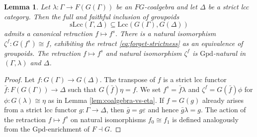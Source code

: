 \documentclass[a4paper]{article}
\newtheorem{lemma}[theorem]{Lemma}
\theoremstyle{remark}
\theoremstyle{definition}
\begin{document}
\begin{lemma}
  \label{lem:strictification}
  Let $\lambda : \Gamma \rightarrow F(G(\Gamma))$ be an $FG$-coalgebra and let $\Delta$ be a strict lcc category.
  Then the full and faithful inclusion of groupoids
  \begin{equation}
    \label{eq:forget-strictness}
    \mathrm{sLcc}(\Gamma, \Delta) \subseteq \mathrm{Lcc}(G(\Gamma), G(\Delta))
  \end{equation}
  admits a canonical retraction $f \mapsto f^s$.
  There is a natural isomorphism $\zeta^f : G(f^s) \cong f$, exhibiting the retract \eqref{eq:forget-strictness} as an equivalence of groupoids.
  The retraction $f \mapsto f^s$ and natural isomorphism $\zeta^f$ is $\mathrm{Gpd}$-natural in $(\Gamma, \lambda)$ and $\Delta$.
\end{lemma}
\begin{proof}
  Let $f : G(\Gamma) \rightarrow G(\Delta)$.
  The transpose of $f$ is a strict lcc functor $\bar f : F(G(\Gamma)) \rightarrow \Delta$ such that $G(\bar f) \eta = f$.
  We set $f^s = \bar f \lambda$ and $\zeta^f = G(\bar f) \phi$ for $\phi : G(\lambda) \cong \eta$ as in Lemma \ref{lem:coalgebra-vs-eta}.
  If $f = G(g)$ already arises from a strict lcc functor $g : \Gamma \rightarrow \Delta$, then $\bar g = g \varepsilon$ and hence $\bar g \lambda = g$.
  The action of the retraction $f \mapsto f^s$ on natural isomorphisms $f_0 \cong f_1$ is defined analogously from the $\mathrm{Gpd}$-enrichment of $F \dashv G$.
\end{proof}
\end{document}
